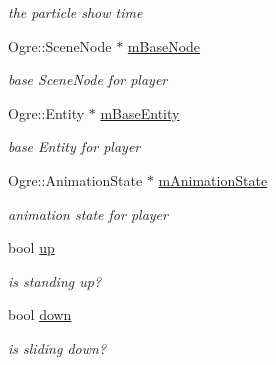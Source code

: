 \begin{DoxyCompactItemize}
\begin{DoxyCompactList}\small\item\em the particle show time \end{DoxyCompactList}\item 
Ogre\+::\+Scene\+Node $\ast$ \hyperlink{class_n_c_t_u_1_1_player_obstacle_afa1a2b93b85ab93d3c620ed3ac634498}{m\+Base\+Node}\hypertarget{class_n_c_t_u_1_1_player_obstacle_afa1a2b93b85ab93d3c620ed3ac634498}{}\label{class_n_c_t_u_1_1_player_obstacle_afa1a2b93b85ab93d3c620ed3ac634498}

\begin{DoxyCompactList}\small\item\em base Scene\+Node for player \end{DoxyCompactList}\item 
Ogre\+::\+Entity $\ast$ \hyperlink{class_n_c_t_u_1_1_player_obstacle_a3e87c6b1ebbccbeadcfa9cbcf0859308}{m\+Base\+Entity}\hypertarget{class_n_c_t_u_1_1_player_obstacle_a3e87c6b1ebbccbeadcfa9cbcf0859308}{}\label{class_n_c_t_u_1_1_player_obstacle_a3e87c6b1ebbccbeadcfa9cbcf0859308}

\begin{DoxyCompactList}\small\item\em base Entity for player \end{DoxyCompactList}\item 
Ogre\+::\+Animation\+State $\ast$ \hyperlink{class_n_c_t_u_1_1_player_obstacle_aa9fad85642b314be7c012f10e8940918}{m\+Animation\+State}\hypertarget{class_n_c_t_u_1_1_player_obstacle_aa9fad85642b314be7c012f10e8940918}{}\label{class_n_c_t_u_1_1_player_obstacle_aa9fad85642b314be7c012f10e8940918}

\begin{DoxyCompactList}\small\item\em animation state for player \end{DoxyCompactList}\item 
bool \hyperlink{class_n_c_t_u_1_1_player_obstacle_a296a2c8a7929abf57308f909bf3c5197}{up}\hypertarget{class_n_c_t_u_1_1_player_obstacle_a296a2c8a7929abf57308f909bf3c5197}{}\label{class_n_c_t_u_1_1_player_obstacle_a296a2c8a7929abf57308f909bf3c5197}

\begin{DoxyCompactList}\small\item\em is standing up? \end{DoxyCompactList}\item 
bool \hyperlink{class_n_c_t_u_1_1_player_obstacle_a740d9c8ca1378dbf329d7059ebf91e4f}{down}\hypertarget{class_n_c_t_u_1_1_player_obstacle_a740d9c8ca1378dbf329d7059ebf91e4f}{}\label{class_n_c_t_u_1_1_player_obstacle_a740d9c8ca1378dbf329d7059ebf91e4f}

\begin{DoxyCompactList}\small\item\em is sliding down? \end{DoxyCompactList}\end{DoxyCompactItemize}
